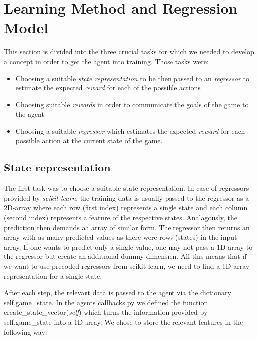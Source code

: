 \documentclass[12pt]{report}
\newcommand{\code}[1]{{\fontfamily{pcr}\selectfont #1}}
\begin{document}

\tableofcontents
\pagebreak

\renewcommand{\thesection}{\arabic{section}}

\section{Learning Method and Regression Model}
This section is divided into the three crucial tasks for which we needed to develop a concept in order to get the agent into training. Those tasks were:

\begin{itemize}
	\item Choosing a suitable \textit{state representation} to be then passed to an \textit{regressor} to estimate the expected \textit{reward} for each of the possible actions
	\item Choosing suitable \textit{rewards} in order to communicate the goals of the game to the agent
	\item Choosing a suitable \textit{regressor} which estimates the expected \textit{reward} for each possible action at the current state of the game.
\end{itemize}

	\subsection{State representation}
	The first task was to choose a suitable state representation. In case of regressors provided by \textit{scikit-learn}, the training data is usually passed to the regressor as a 2D-array where each row (first index) represents a single state and each column (second index) represents a feature of the respective states. Analagously, the prediction then demands an array of similar form. The regressor then returns an array with as many predicted values as there were rows (states) in the input array. If one wants to predict only a single value, one may not pass a 1D-array to the regressor but create an additional dummy dimension. All this means that if we want to use precoded regressors from scikit-learn, we need to find a 1D-array representation for a single state. \par
	
	After each step, the relevant data is passed to the agent via the dictionary \code{self.game\_state}. In the agents \code{callbacks.py} we defined the function \code{create\_state\_vector(\textit{self})} which turns the information provided by \code{self.game\_state} into a 1D-array. We chose to store the relevant features in the following way:
	
\end{document}
